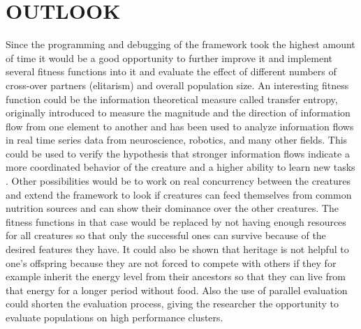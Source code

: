 \documentclass[letterpaper, 10 pt, conference]{ieeeconf}  %
\begin{document}
\section{OUTLOOK}
Since the programming and debugging of the framework took the highest amount of time it would be a good opportunity to further improve it and implement several fitness functions into it and evaluate the effect of different numbers of cross-over partners (elitarism) and overall population size. An interesting fitness function could be the information theoretical measure called transfer entropy, originally introduced to measure the magnitude and the direction of information flow from one element to another and has been used to analyze information flows in real time series data from neuroscience, robotics, and many other fields. This could be used to verify the hypothesis that stronger information flows indicate a more coordinated behavior of the creature and a higher ability to learn new tasks \cite{Schmidt2013}. Other possibilities would be to work on real concurrency between the creatures and extend the framework to look if creatures can feed themselves from common nutrition sources and can show their dominance over the other creatures. The fitness functions in that case would be replaced by not having enough resources for all creatures so that only the successful ones can survive because of the desired features they have. It could also be shown that heritage is not helpful to one's offspring because they are not forced to compete with others if they for example inherit the energy level from their ancestors so that they can live from that energy for a longer period without food. Also the use of parallel evaluation could shorten the evaluation process, giving the researcher the opportunity to evaluate populations on high performance clusters.



\addtolength{\textheight}{-12cm}   %









\end{document}
